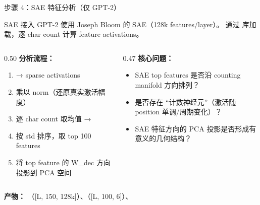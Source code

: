 \begin{frame}{步骤 4：SAE 特征分析（仅 GPT-2）}
\small
\begin{block}{SAE 接入}
GPT-2 使用 Joseph Bloom 的  SAE（128k features/layer）。
通过  库加载，逐 char count 计算 feature activations。
\end{block}

\begin{columns}[T,onlytextwidth]
\begin{column}{0.50\linewidth}
\textbf{分析流程：}
\begin{enumerate}
  \item {} → sparse activations
  \item 乘以  norm（还原真实激活幅度）
  \item 逐 char count 取均值 → \code{[150, 128k]}
  \item 按 std 排序，取 top 100 features
  \item 将 top feature 的 W\_dec 方向投影到 PCA 空间
\end{enumerate}
\end{column}
\begin{column}{0.47\linewidth}
\textbf{核心问题：}
\begin{itemize}
  \item SAE top features 是否沿 counting manifold 方向排列？
  \item 是否存在 ``计数神经元''（激活随 position 单调/周期变化）？
  \item SAE 特征方向的 PCA 投影是否形成有意义的几何结构？
\end{itemize}
\end{column}
\end{columns}

\vspace{0.4em}
\textbf{产物：}
（[L, 150, 128k]）、（[L, 100, 6]）、
\end{frame}
